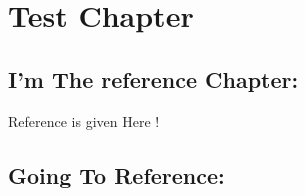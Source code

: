 \chapter{Test Chapter}                          %
\section{I'm The reference Chapter:}             %
Reference is given Here !
\section{Going To Reference:}                              %